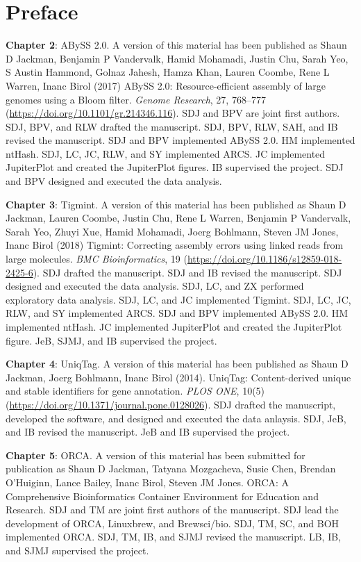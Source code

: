 \documentclass[
  12pt,
  oneside,
  openany]{book}
\begin{document}
\hypertarget{preface}{%
\section{Preface}\label{preface}}

\textbf{Chapter 2}: ABySS 2.0. A version of this material has been published as Shaun D Jackman, Benjamin P Vandervalk, Hamid Mohamadi, Justin Chu, Sarah Yeo, S Austin Hammond, Golnaz Jahesh, Hamza Khan, Lauren Coombe, Rene L Warren, Inanc Birol (2017) ABySS 2.0: Resource-efficient assembly of large genomes using a Bloom filter. \emph{Genome Research}, 27, 768--777 (\url{https://doi.org/10.1101/gr.214346.116}). SDJ and BPV are joint first authors. SDJ, BPV, and RLW drafted the manuscript. SDJ, BPV, RLW, SAH, and IB revised the manuscript. SDJ and BPV implemented ABySS 2.0. HM implemented ntHash. SDJ, LC, JC, RLW, and SY implemented ARCS. JC implemented JupiterPlot and created the JupiterPlot figures. IB supervised the project. SDJ and BPV designed and executed the data analysis.

\textbf{Chapter 3}: Tigmint. A version of this material has been published as Shaun D Jackman, Lauren Coombe, Justin Chu, Rene L Warren, Benjamin P Vandervalk, Sarah Yeo, Zhuyi Xue, Hamid Mohamadi, Joerg Bohlmann, Steven JM Jones, Inanc Birol (2018) Tigmint: Correcting assembly errors using linked reads from large molecules. \emph{BMC Bioinformatics}, 19 (\url{https://doi.org/10.1186/s12859-018-2425-6}). SDJ drafted the manuscript. SDJ and IB revised the manuscript. SDJ designed and executed the data analysis. SDJ, LC, and ZX performed exploratory data analysis. SDJ, LC, and JC implemented Tigmint. SDJ, LC, JC, RLW, and SY implemented ARCS. SDJ and BPV implemented ABySS 2.0. HM implemented ntHash. JC implemented JupiterPlot and created the JupiterPlot figure. JeB, SJMJ, and IB supervised the project.

\textbf{Chapter 4}: UniqTag. A version of this material has been published as Shaun D Jackman, Joerg Bohlmann, Inanc Birol (2014). UniqTag: Content-derived unique and stable identifiers for gene annotation. \emph{PLOS ONE}, 10(5) (\url{https://doi.org/10.1371/journal.pone.0128026}). SDJ drafted the manuscript, developed the software, and designed and executed the data anlaysis. SDJ, JeB, and IB revised the manuscript. JeB and IB supervised the project.

\textbf{Chapter 5}: ORCA. A version of this material has been submitted for publication as Shaun D Jackman, Tatyana Mozgacheva, Susie Chen, Brendan O'Huiginn, Lance Bailey, Inanc Birol, Steven JM Jones. ORCA: A Comprehensive Bioinformatics Container Environment for Education and Research. SDJ and TM are joint first authors of the manuscript. SDJ lead the development of ORCA, Linuxbrew, and Brewsci/bio. SDJ, TM, SC, and BOH implemented ORCA. SDJ, TM, IB, and SJMJ revised the manuscript. LB, IB, and SJMJ supervised the project.
\end{document}

